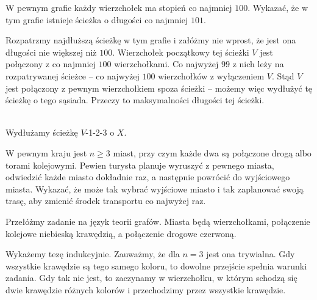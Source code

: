 \newpage
{}

\begin{problem}{1}
	W pewnym grafie każdy wierzchołek ma stopień co najmniej $100$. Wykazać, że w tym grafie istnieje ścieżka o długości co najmniej $101$.
\end{problem}

\noindent
Rozpatrzmy najdłuższą ścieżkę w tym grafie i załóżmy nie wprost, że jest ona długości nie większej niż $100$. Wierzchołek początkowy tej ścieżki $V$ jest połączony z co najmniej $100$ wierzchołkami. Co najwyżej $99$ z nich leży na rozpatrywanej ścieżce -- co najwyżej $100$ wierzchołków z wyłączeniem $V$. Stąd $V$ jest połączony z pewnym wierzchołkiem spoza ścieżki – możemy więc wydłużyć tę ścieżkę o tego sąsiada. Przeczy to maksymalności długości tej ścieżki.

\begin{center}
    \\
    Wydłużamy ścieżkę $V$-1-2-3 o $X$.\\
\end{center}


\begin{problem}{2}
	W pewnym kraju jest $n \geqslant{3}$ miast, przy czym każde dwa są połączone drogą albo torami kolejowymi. Pewien turysta planuje wyruszyć z pewnego miasta, odwiedzić każde miasto dokładnie raz, a następnie powrócić do wyjściowego miasta. Wykazać, że może tak wybrać wyjściowe miasto i tak zaplanować swoją trasę, aby zmienić środek transportu co najwyżej raz.
\end{problem}

\noindent
Przełóżmy zadanie na język teorii grafów. Miasta będą wierzchołkami, połączenie kolejowe niebieską krawędzią, a połączenie drogowe czerwoną.

\vspace{5px}

\noindent
Wykażemy tezę indukcyjnie. Zauważmy, że dla $n = 3$ jest ona trywialna. Gdy wszystkie krawędzie są tego samego koloru, to dowolne przejście spełnia warunki zadania. Gdy tak nie jest, to zaczynamy w wierzchołku, w którym schodzą się dwie krawędzie różnych kolorów i przechodzimy przez wszystkie krawędzie.

